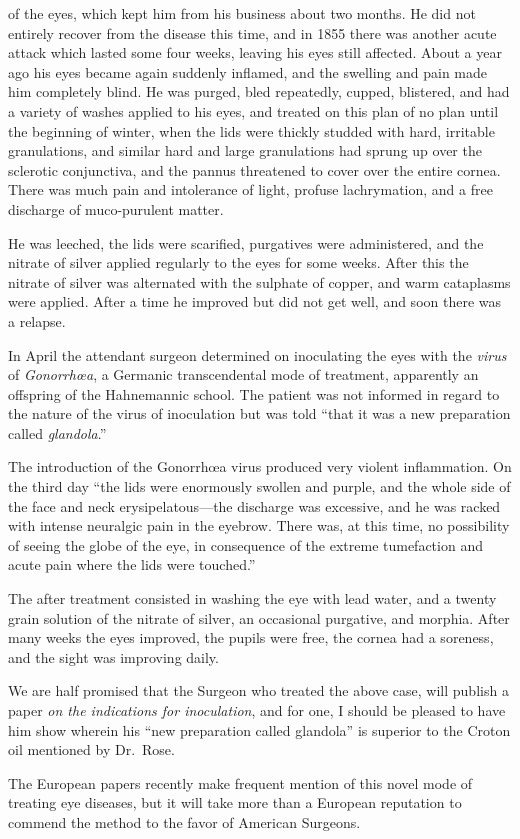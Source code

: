  of the eyes, which kept him from his business about two months.
He did not entirely recover from the disease this time, and in 1855
there was another acute attack which lasted some four weeks, leaving
his eyes still affected. About a year ago his eyes became again suddenly
inflamed, and the swelling and pain made him completely blind.
He was purged, bled repeatedly, cupped, blistered, and had a variety of
washes applied to his eyes, and treated on this plan of no plan until the
beginning of winter, when the lids were thickly studded with hard, irritable
granulations, and similar hard and large granulations had sprung
up over the sclerotic conjunctiva, and the pannus threatened to cover over
the entire cornea. There was much pain and intolerance of light, profuse
lachrymation, and a free discharge of muco-purulent matter.

He was leeched, the lids were scarified, purgatives were administered,
and the nitrate of silver applied regularly to the eyes for some weeks.
After this the nitrate of silver was alternated with the sulphate of copper,
and warm cataplasms were applied. After a time he improved
but did not get well, and soon there was a relapse.

In April the attendant surgeon determined on inoculating the eyes
with the \emph{virus} of \emph{Gonorrhœa}, a Germanic transcendental mode of
treatment, apparently an offspring of the Hahnemannic school. The patient
was not informed in regard to the nature of the virus of inoculation
but was told ``that it was a new preparation called \emph{glandola}.''

The introduction of the Gonorrhœa virus produced very violent inflammation.
On the third day ``the lids were enormously swollen and
purple, and the whole side of the face and neck erysipelatous---the discharge
was excessive, and he was racked with intense neuralgic pain in
the eyebrow. There was, at this time, no possibility of seeing the globe of
the eye, in consequence of the extreme tumefaction and acute pain
where the lids were touched.''

The after treatment consisted in washing the eye with lead water, and
a twenty grain solution of the nitrate of silver, an occasional purgative,
and morphia. After many weeks the eyes improved, the pupils were
free, the cornea had a soreness, and the sight was improving daily.

We are half promised that the Surgeon who treated the above case,
will publish a paper \emph{on the indications for inoculation}, and for one,
I should be pleased to have him show wherein his ``new preparation
called glandola'' is superior to the Croton oil mentioned by Dr.~Rose.

The European papers recently make frequent mention of this novel
mode of treating eye diseases, but it will take more than a European
reputation to commend the method to the favor of American Surgeons.

\endinput
